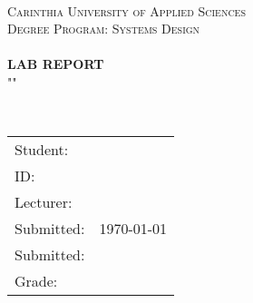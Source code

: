 \begin{titlepage}

\begin{center}


	\\[1cm]
	
\textsc{\LARGE Carinthia University of Applied Sciences}\\[1.5cm]

\textsc{\Large Degree Program: Systems Design}\\[5cm]


\HRule \\[1cm]
{ \huge \bfseries LAB REPORT }\\[.5cm]
"\course"\\[.3cm]
\labtitle

\HRule \\[3cm]



\vfill

	\begin{table}[H]
		\centering
		\begin{tabular}{|l|c|}
			\toprule
			Student: & \stusurname\ \textsc{\stuname} \\
			ID: & \stuid   	\\
			\midrule
			Lecturer: & \lecturer  \\
			Submitted: & {\large \today}  	\\
			Submitted: &  \\
			Grade: &  \\
			\bottomrule
		\end{tabular}
	\end{table}


\end{center}

\end{titlepage}